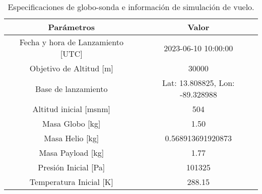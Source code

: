 \begin{table}[h]
\centering
\caption{Especificaciones de globo-sonda e información de simulación de vuelo.}
\label{tab:datos_start_input}
\begin{tabular}{cc}
\toprule
              \textbf{Parámetros} &                  \textbf{Valor} \\
\midrule
Fecha y hora de Lanzamiento [UTC] &             2023-06-10 10:00:00 \\
         Objetivo de Altitud  [m] &                           30000 \\
              Base de lanzamiento & Lat: 13.808825, Lon: -89.328988 \\
        Altitud inicial [msnm]    &                             504 \\
                  Masa Globo [kg] &                            1.50 \\
                  Masa Helio [kg] &               0.568913691920873 \\
                Masa Payload [kg] &                            1.77 \\
             Presión Inicial [Pa] &                          101325 \\
          Temperatura Inicial [K] &                          288.15 \\
\bottomrule
\end{tabular}
\end{table}
